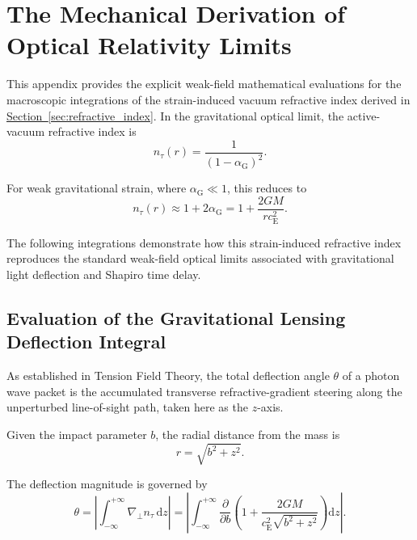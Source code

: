 \chapter{The Mechanical Derivation of Optical Relativity Limits}
\label{app:optical_relativity}

This appendix provides the explicit weak-field mathematical evaluations for the macroscopic integrations of the strain-induced vacuum refractive index derived in \hyperref[sec:refractive_index]{Section~\ref*{sec:refractive_index}}. In the gravitational optical limit, the active-vacuum refractive index is
\begin{equation}
    n_\tau(r) = \frac{1}{(1-\alpha_{\mathrm{G}})^2}.
\end{equation}

For weak gravitational strain, where $\alpha_{\mathrm{G}} \ll 1$, this reduces to
\begin{equation}
    n_\tau(r) \approx 1+2\alpha_{\mathrm{G}} = 1+\frac{2GM}{r c_{\mathrm{E}}^2}.
\end{equation}

The following integrations demonstrate how this strain-induced refractive index reproduces the standard weak-field optical limits associated with gravitational light deflection and Shapiro time delay.

\section{Evaluation of the Gravitational Lensing Deflection Integral}
As established in Tension Field Theory, the total deflection angle $\theta$ of a photon wave packet is the accumulated transverse refractive-gradient steering along the unperturbed line-of-sight path, taken here as the $z$-axis.

Given the impact parameter $b$, the radial distance from the mass is
\begin{equation}
    r = \sqrt{b^2 + z^2}.
\end{equation}

The deflection magnitude is governed by
\begin{equation}
    \theta = \left| \int_{-\infty}^{+\infty} \nabla_{\perp} n_\tau \,\mathrm{d}z \right| = \left| \int_{-\infty}^{+\infty} \frac{\partial}{\partial b} \left( 1+ \frac{2GM}{c_{\mathrm{E}}^2\sqrt{b^2+z^2}} \right) \mathrm{d}z \right|.
\end{equation}

